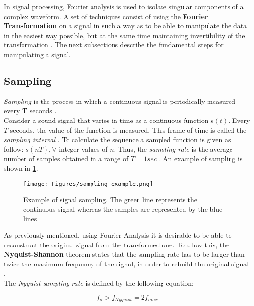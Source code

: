 \noindent In signal processing, Fourier analysis is used to isolate singular components of a complex waveform. A set of techniques consist of using the \textbf{Fourier Transformation} on a signal in such a way as to be able to manipulate the data in the easiest way possible, but at the same time maintaining invertibility of the transformation \cite{rabiner1975theory}. The next subsections describe the fundamental steps for manipulating a signal.

\subsection{Sampling}
\label{ssubs:sampling}

\textit{Sampling} is the process in which a continuous signal is periodically measured every \textbf{T} seconds \cite{orfanidis1995introduction}. \\
\noindent Consider a sound signal that varies in time as a continuous function $s(t)$. Every $T$ seconds, the value of the function is measured. This frame of time is called the \textit{sampling interval} \cite{weik2012communications}. To calculate the sequence a sampled function is given as follow: $s(nT), \forall$ integer values of $n$. Thus, the \textit{sampling rate} is the average number of samples obtained in a range of $T = 1sec$ \cite{sampling_wiki}. An example of sampling is shown in \ref{fig:sampling_ex}.

\begin{figure}[!ht]
	\centering
	\texttt{[image: Figures/sampling\_example.png]}
	\caption{Example of signal sampling. The green line represents the continuous signal whereas the samples are represented by the blue lines \cite{sampling_wiki}}
	\label{fig:sampling_ex}
\end{figure}

\noindent As previously mentioned, using Fourier Analysis it is desirable to be able to reconstruct the original signal from the transformed one. To allow this, the \textbf{Nyquist-Shannon} theorem states that the sampling rate has to be larger than twice the maximum frequency of the signal, in order to rebuild the original signal \cite{sampling_illinois}.\\
\noindent The \textit{Nyquist sampling rate} is defined by the following equation:

\begin{equation}
f_{s} > f_{Nyquist} = 2f_{max}
\end{equation}



